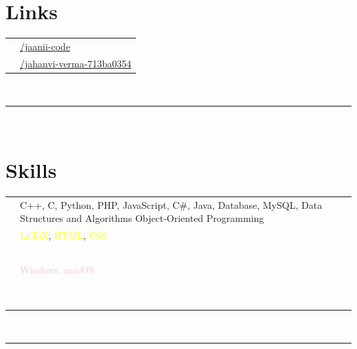 \documentclass[oneside]{article}
\begin{document}
{\begin{minipage}[t][\textheight-2\fboxsep-2\fboxrule][t]{\dimexpr0.40\textwidth-2\fboxrule-2\fboxsep\relax}
        \section*{\large Links}
        \begin{tabular}{cl}
            \faGithub{}   & \href{https://github.com/jaanii-code}{/jaanii-code} \\
            \faLinkedin{} & \href{https://www.linkedin.com/in/jahanvi-verma-713ba0354/}{/jahanvi-verma-713ba0354} \\
        \end{tabular}
        \vspace{23pt} \\
        \rule{\linewidth}{0.4pt} \\

        \section*{\large Skills}
        \begin{tabularx}{\textwidth}{cY}
    \faCode{} &
   {C++},
    {C},
    {Python},
    {PHP},
    {JavaScript},
    {C\#},
    {Java},
    {Database},
    {MySQL},
    {Data Structures and Algorithms}
    {Object-Oriented Programming}
    \\

    \faPen*{} &
    \textcolor{yellow}{\LaTeX},
    \textcolor{yellow}{HTML},
    \textcolor{yellow}{CSS} \\

    \faFont{} &
    \textcolor{white}{{MS Office, GSuite, Adobe Acrobat}} \\

    \faCogs{} &
    \textcolor{pink}{Windows, macOS} \\
    \faUsers{} &
     \textcolor{white}{{TeamWork, Time-Management, Critical Thinking,  Problem Solving,  Logical Thinking}} \\

\end{tabularx}
 \vspace{1pt} \\
        \rule{\linewidth}{0.4pt} %

\end{minipage}}
\end{document}
